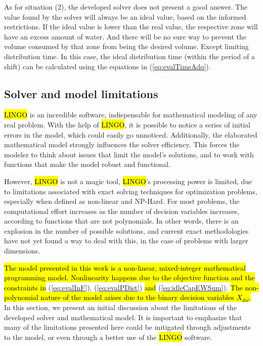 \documentclass{singlecol}
\theoremstyle{TH}{
\newtheorem{lemma}{Lemma}
\newtheorem{theorem}[lemma]{Theorem}
\newtheorem{corrolary}[lemma]{Corrolary}
\newtheorem{conjecture}[lemma]{Conjecture}
\newtheorem{proposition}[lemma]{Proposition}
\newtheorem{claim}[lemma]{Claim}
\newtheorem{stheorem}[lemma]{Wrong Theorem}
\newtheorem{algorithm}{Algorithm}
}
\theoremstyle{THrm}{
\newtheorem{definition}{Definition}[section]
\newtheorem{question}{Question}[section]
\newtheorem{remark}{Remark}
\newtheorem{scheme}{Scheme}
}
\theoremstyle{THhit}{
\newtheorem{case}{Case}[section]
}
\begin{document}
As for situation (2), the developed solver does not present a good answer. The value found by the solver will always be an ideal value, based on the informed restrictions. If the ideal value is lower than the real value, the respective zone will have an excess amount of water. And there will be no sure way to prevent the volume consumed by that zone from being the desired volume. Except limiting distribution time. In this case, the ideal distribution time (within the period of a shift) can be calculated using the equations in (\ref{eq:evalTimeAdq}). 

\subsection{Solver and model limitations}
\label{sec:limitations}

\hl{LINGO} is an incredible software, indispensable for mathematical modeling of any real problem. With the help of \hl{LINGO}, it is possible to notice a series of initial errors in the model, which could easily go unnoticed. Additionally, the elaborated mathematical model strongly influences the solver efficiency. This forces the modeler to think about issues that limit the model's solutions, and to work with functions that make the model robust and functional.

However, \hl{LINGO} is not a magic tool, \hl{LINGO}'s processing power is limited, due to limitations associated with exact solving techniques for optimization problems, especially when defined as non-linear and NP-Hard. For most problems, the computational effort increases as the number of decision variables increases, according to functions that are not polynomials. In other words, there is an explosion in the number of possible solutions, and current exact methodologies have not yet found a way to deal with this, in the case of problems with larger dimensions. 

\label{nonlinerarityExp}{\hl{The model presented in this work is a non-linear, mixed-integer mathematical programming model. Nonlinearity happens due to the objective function and the constraints in}} (\ref{eq:evalInF}), (\ref{eq:evalPDist}) \hl{and} (\ref{eq:idleCapEWSum}). \hl{The non-polynomial nature of the model arises due to the binary decision variables $X_{dsl}$.} In this section, we present an initial discussion about the limitations of the developed solver and mathematical model. It is important to emphasize that many of the limitations presented here could be mitigated through adjustments to the model, or even through a better use of the \hl{LINGO} software. 
\end{document}
